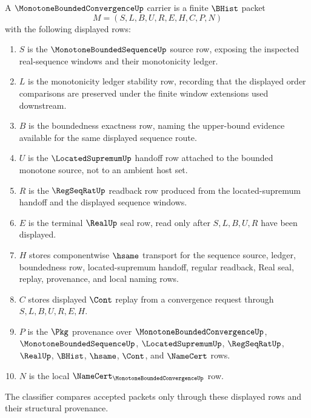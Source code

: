 \begin{definition}
\label{def:monotone-bounded-convergence-carrier}
A $\MonotoneBoundedConvergenceUp$ carrier is a finite $\BHist$ packet
$$
M=(S,L,B,U,R,E,H,C,P,N)
$$
with the following displayed rows:
\begin{enumerate}
\item $S$ is the $\MonotoneBoundedSequenceUp$ source row, exposing the inspected real-sequence windows and their monotonicity ledger.
\item $L$ is the monotonicity ledger stability row, recording that the displayed order comparisons are preserved under the finite window extensions used downstream.
\item $B$ is the boundedness exactness row, naming the upper-bound evidence available for the same displayed sequence route.
\item $U$ is the $\LocatedSupremumUp$ handoff row attached to the bounded monotone source, not to an ambient host set.
\item $R$ is the $\RegSeqRatUp$ readback row produced from the located-supremum handoff and the displayed sequence windows.
\item $E$ is the terminal $\RealUp$ seal row, read only after $S,L,B,U,R$ have been displayed.
\item $H$ stores componentwise $\hsame$ transport for the sequence source, ledger, boundedness row, located-supremum handoff, regular readback, Real seal, replay, provenance, and local naming rows.
\item $C$ stores displayed $\Cont$ replay from a convergence request through $S,L,B,U,R,E,H$.
\item $P$ is the $\Pkg$ provenance over $\MonotoneBoundedConvergenceUp$, $\MonotoneBoundedSequenceUp$, $\LocatedSupremumUp$, $\RegSeqRatUp$, $\RealUp$, $\BHist$, $\hsame$, $\Cont$, and $\NameCert$ rows.
\item $N$ is the local $\NameCert_{\MonotoneBoundedConvergenceUp}$ row.
\end{enumerate}
The classifier compares accepted packets only through these displayed rows and their structural provenance.
\end{definition}

